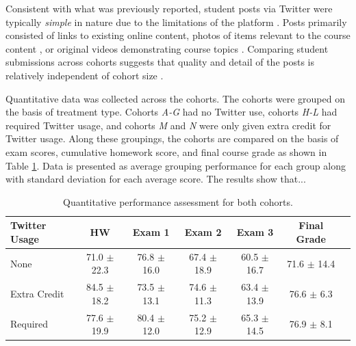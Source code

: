 \documentclass[12pt]{article}
\begin{document}
Consistent with what was previously reported, student posts via Twitter were typically \textit{simple} in nature due to the limitations of the platform \cite{berg_evaluation_2014}. Posts primarily consisted of links to existing online content, photos of items relevant to the course content \cite{berg_relationship_2015}, or original videos demonstrating course topics \cite{cleveland_impact_2014}. Comparing student submissions across cohorts suggests that quality and detail of the posts is relatively independent of cohort size \cite{_twitter_}.

Quantitative data was collected across the cohorts. The cohorts were grouped on the basis of treatment type. Cohorts \textit{A-G} had no Twitter use, cohorts \textit{H-L} had required Twitter usage, and cohorts \textit{M} and \textit{N} were only given extra credit for Twitter usage. Along these groupings, the cohorts are compared on the basis of exam scores, cumulative homework score, and final course grade as shown in Table \ref{quantPerformance}. Data is presented as average grouping performance for each group along with standard deviation for each average score. The results show that...

\begin{table}[H]
\caption{Quantitative performance assessment for both cohorts.}
\begin{center}
\label{quantPerformance}
\begin{tabular}{lcccccc}
\hline
 Twitter Usage & HW & Exam 1 & Exam 2 & Exam 3 & Final Grade\\
\hline
 None & 71.0 $\pm$ 22.3 & 76.8 $\pm$ 16.0 & 67.4 $\pm$ 18.9 & 60.5 $\pm$ 16.7 & 71.6 $\pm$ 14.4\\ 
 Extra Credit & 84.5 $\pm$ 18.2 & 73.5 $\pm$ 13.1 & 74.6 $\pm$ 11.3 & 63.4 $\pm$ 13.9 & 76.6 $\pm$ 6.3\\ 
 Required & 77.6 $\pm$ 19.9 & 80.4 $\pm$ 12.0 & 75.2 $\pm$ 12.9 & 65.3 $\pm$ 14.5 & 76.9 $\pm$ 8.1\\ 
\hline
\end{tabular}
\end{center}
\end{table}
\end{document}
